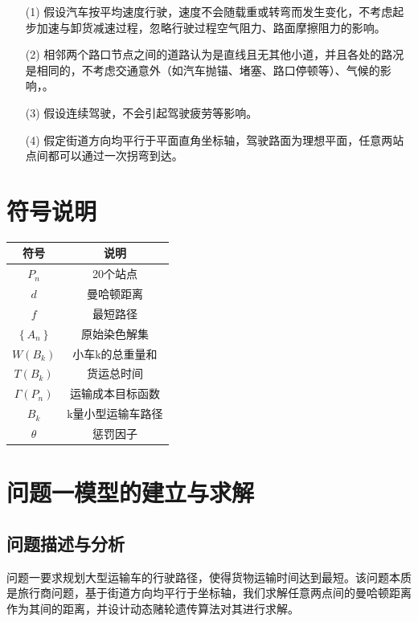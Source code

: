 \documentclass{whutmod}
\begin{document}
	\begin{itemize}                                             
	\item [(1)] 假设汽车按平均速度行驶，速度不会随载重或转弯而发生变化，不考虑起步加速与卸货减速过程，忽略行驶过程空气阻力、路面摩擦阻力的影响。
	\item [(2)] 相邻两个路口节点之间的道路认为是直线且无其他小道，并且各处的路况是相同的，不考虑交通意外（如汽车抛锚、堵塞、路口停顿等）、气候的影响，。
	\item [(3)] 假设连续驾驶，不会引起驾驶疲劳等影响。
	\item [(4)] 假定街道方向均平行于平面直角坐标轴，驾驶路面为理想平面，任意两站点间都可以通过一次拐弯到达。
\end{itemize}

		
	\section{符号说明}
	\begin{table}[H]
	\label{biao} \centering
	\begin{tabular}{cc}
		\toprule[1.5pt]
		\multicolumn{1}{m{5cm}}{\centering 符号} & \multicolumn{1}{m{5cm}}{\centering 说明} \\
		\midrule[0.5pt]		
		$P_n$  & 20个站点  \\ 
		$d$  &  曼哈顿距离 \\ 
		$f$  &  最短路径\\
		$\left \{ A_n \right \}$  &  原始染色解集\\
				$W(B_k)$  & 小车k的总重量和\\
						$T(B_k)$  & 货运总时间\\
		$\Gamma (P_n)$  & 运输成本目标函数\\
		$B_k$  & k量小型运输车路径\\
		$\theta$&惩罚因子\\
		\bottomrule[1.5pt]
	\end{tabular}
\end{table}

	\section{问题一模型的建立与求解}
    \subsection{问题描述与分析}
问题一要求规划大型运输车的行驶路径，使得货物运输时间达到最短。该问题本质是旅行商问题，基于街道方向均平行于坐标轴，我们求解任意两点间的曼哈顿距离作为其间的距离，并设计动态赌轮遗传算法对其进行求解。
\end{document}
